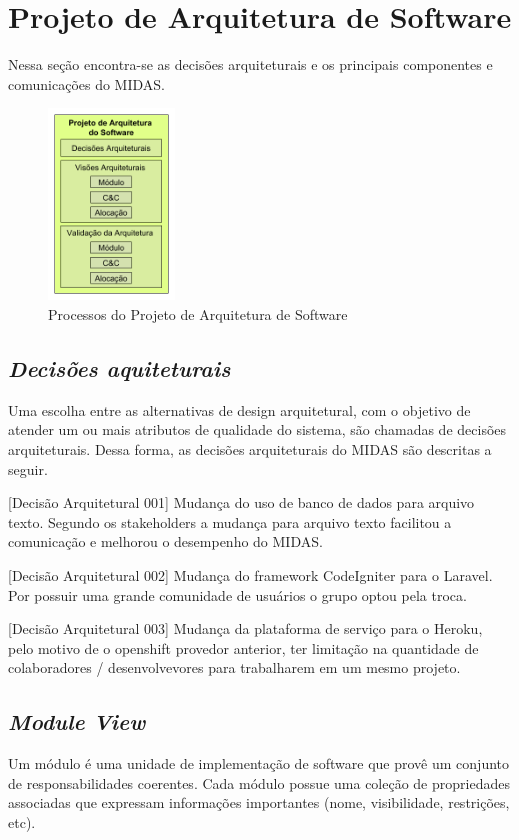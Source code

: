 \documentclass[11pt,a4paper]{article}
\begin{document}
\newpage
\section{Projeto de Arquitetura de Software}
\label{sec:pas}
Nessa seção encontra-se as decisões arquiteturais e os principais componentes e
comunicações do MIDAS.
\begin{figure} [h!]
  \centering
    \includegraphics[width=0.3\textwidth]{projarquitect}
  \caption{Processos do Projeto de Arquitetura de Software} 
  \label{fig:projarquitect}
\end{figure}

\subsection{\textit{Decisões aquiteturais}}

Uma escolha entre as alternativas de design arquitetural, com o objetivo de atender um ou mais atributos de qualidade do sistema, são chamadas de decisões arquiteturais. Dessa forma, as decisões arquiteturais do MIDAS são descritas a seguir.

[Decisão Arquitetural 001] Mudança do uso de banco de dados para arquivo texto. Segundo os stakeholders a mudança para arquivo texto facilitou a comunicação e melhorou o desempenho do MIDAS.

[Decisão Arquitetural 002] Mudança do framework CodeIgniter para o Laravel. Por possuir uma grande comunidade de usuários o grupo optou pela troca.

[Decisão Arquitetural 003] Mudança da plataforma de serviço para o Heroku, pelo motivo de o openshift provedor anterior, ter limitação na quantidade de colaboradores / desenvolvevores para trabalharem em um mesmo projeto. 

\subsection{\textit{Module View}}
\label{subsec:mv}
Um módulo é uma unidade de implementação de software que provê um conjunto de responsabilidades coerentes. Cada módulo possue uma coleção de propriedades associadas que expressam informações importantes (nome, visibilidade, restrições, etc).
\end{document}
